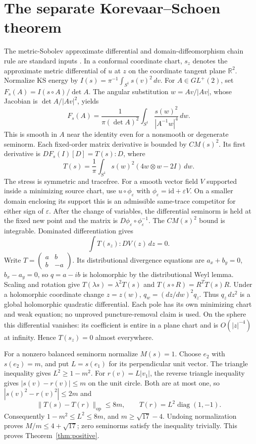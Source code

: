 \documentclass[11pt]{article}
\newcommand{\R}{\mathbb R}
\newcommand{\op}{\operatorname{op}}
\begin{document}
\section{The separate Korevaar--Schoen theorem}
The metric-Sobolev approximate differential and domain-diffeomorphism chain
rule are standard inputs \cite{ks,mvw,lw}. In a conformal coordinate chart,
$s_z$ denotes the approximate metric differential of $u$ at $z$ on the
coordinate tangent plane $\R^2$. Normalize KS energy by
$I(s)=\pi^{-1}\int_{S^1}s(v)^2\,dv$. For $A\in GL^+(2)$, set
$F_s(A)=I(s\circ A)/\det A$. The angular substitution $w=Av/|Av|$, whose
Jacobian is $\det A/|Av|^2$, yields
\begin{equation}\label{eq:angular}
 F_s(A)=\frac1{\pi(\det A)^2}\int_{S^1}
             \frac{s(w)^2}{|A^{-1}w|^4}\,dw.
\end{equation}
This is smooth in $A$ near the identity even for a nonsmooth or degenerate
seminorm. Each fixed-order matrix derivative is bounded by $C M(s)^2$.
Its first derivative is $DF_s(I)[D]=T(s):D$, where
\[
 T(s)=\frac1\pi\int_{S^1}s(w)^2(4w\otimes w-2I)\,dw.
\]
The stress is symmetric and tracefree. For a smooth vector field $V$ supported
inside a minimizing source chart, use $u\circ\phi_\varepsilon$ with
$\phi_\varepsilon=\mathrm{id}+\varepsilon V$. On a smaller domain enclosing
its support this is an admissible same-trace competitor for either sign of
$\varepsilon$. After the change of variables, the differential seminorm
is held at the fixed new point and the matrix is
$D\phi_\varepsilon\circ\phi_\varepsilon^{-1}$. The $CM(s)^2$ bound is
integrable. Dominated differentiation gives
\[
 \int T(s_z):DV(z)\,dz=0.
\]
Write $T=\left(\begin{smallmatrix}a&b\\b&-a\end{smallmatrix}\right)$.
Its distributional divergence equations are
$a_x+b_y=0$, $b_x-a_y=0$, so $q=a-ib$ is holomorphic by the distributional
Weyl lemma. Scaling and rotation give
$T(\lambda s)=\lambda^2T(s)$ and $T(s\circ R)=R^TT(s)R$.
Under a holomorphic coordinate change $z=z(w)$,
$q_w=(dz/dw)^2q_z$. Thus $q_z\,dz^2$ is a global holomorphic quadratic
differential. Each pole has its own minimizing chart and weak equation;
no unproved puncture-removal claim is used. On the sphere this differential
vanishes: its coefficient is entire in a plane chart and is $O(|z|^{-4})$
at infinity. Hence $T(s_z)=0$ almost everywhere.

For a nonzero balanced seminorm normalize $M(s)=1$. Choose $e_2$ with
$s(e_2)=m$, and put $L=s(e_1)$ for its perpendicular unit vector.
The triangle inequality gives $L^2\ge1-m^2$. For $r(v)=L|v_1|$,
the reverse triangle inequality gives $|s(v)-r(v)|\le m$ on the unit circle.
Both are at most one, so $|s(v)^2-r(v)^2|\le2m$ and
\[
 \|T(s)-T(r)\|_{\op}\le8m,\qquad T(r)=L^2\operatorname{diag}(1,-1).
\]
Consequently $1-m^2\le L^2\le8m$, and $m\ge\sqrt{17}-4$.
Undoing normalization proves $M/m\le4+\sqrt{17}$; zero seminorms satisfy
the inequality trivially. This proves Theorem~\ref{thm:positive}.
\end{document}
